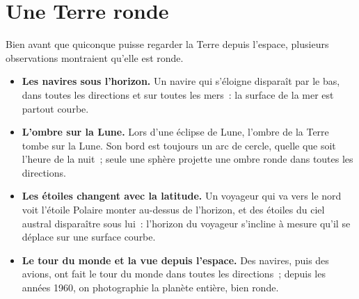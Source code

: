\section{Une Terre ronde}

Bien avant que quiconque puisse regarder la Terre depuis l'espace, plusieurs
observations montraient qu'elle est ronde.
\begin{itemize}
  \item \textbf{Les navires sous l'horizon.} Un navire qui s'éloigne
        disparaît par le bas, dans toutes les directions et sur toutes les
        mers~: la surface de la mer est partout courbe.
  \item \textbf{L'ombre sur la Lune.} Lors d'une éclipse de Lune, l'ombre de
        la Terre tombe sur la Lune. Son bord est toujours un arc de cercle,
        quelle que soit l'heure de la nuit~; seule une sphère projette une
        ombre ronde dans toutes les directions.
  \item \textbf{Les étoiles changent avec la latitude.} Un voyageur qui va
        vers le nord voit l'étoile Polaire monter au-dessus de l'horizon,
        et des étoiles du ciel austral disparaître sous lui~: l'horizon du
        voyageur s'incline à mesure qu'il se déplace sur une surface courbe.
  \item \textbf{Le tour du monde et la vue depuis l'espace.} Des navires,
        puis des avions, ont fait le tour du monde dans toutes les
        directions~; depuis les années 1960, on photographie la planète
        entière, bien ronde.
\end{itemize}

